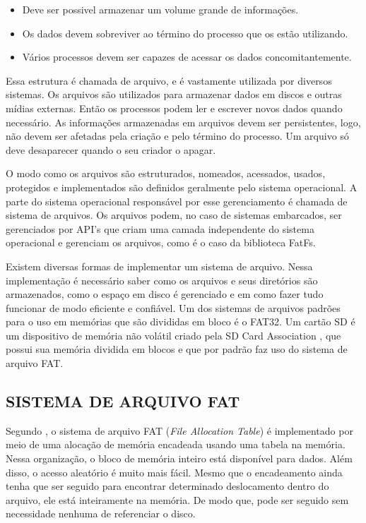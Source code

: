\begin{itemize}
    \item Deve ser possivel armazenar um volume grande de informações.
    \item Os dados devem sobreviver ao término do processo que os estão utilizando.
    \item Vários processos devem ser capazes de acessar os dados concomitantemente.
\end{itemize}

Essa estrutura é chamada de arquivo, e é vastamente utilizada por diversos sistemas. Os arquivos são utilizados para armazenar dados em discos e outras mídias externas. Então os processos podem ler e escrever novos dados quando necessário. As informações armazenadas em arquivos devem ser persistentes, logo, não devem ser afetadas pela criação e pelo término do processo. Um arquivo só deve desaparecer quando o seu criador o apagar.

O modo como os arquivos são estruturados, nomeados, acessados, usados, protegidos e implementados são definidos geralmente pelo sistema operacional. A parte do sistema operacional responsável por esse gerenciamento é chamada de sistema de arquivos. Os arquivos podem, no caso de sistemas embarcados, ser gerenciados por API's que criam uma camada independente do sistema operacional e gerenciam os arquivos, como é o caso da biblioteca FatFs. 

Existem diversas formas de implementar um sistema de arquivo. Nessa implementação é necessário saber como os arquivos e seus diretórios são armazenados, como o espaço em disco é gerenciado e em como fazer tudo funcionar de modo eficiente e confiável. 
Um dos sistemas de arquivos padrões para o uso em memórias que são divididas em bloco é o FAT32. 
Um cartão SD é um dispositivo de memória não volátil criado pela SD Card Association \cite{SDCARD}, que possui sua memória dividida em blocos e que por padrão faz uso do sistema de arquivo FAT.




\subsection{SISTEMA DE ARQUIVO FAT}

Segundo , o sistema de arquivo FAT (\textit{File Allocation Table}) é implementado por meio de uma alocação de memória encadeada usando uma tabela na memória. Nessa organização, o bloco de memória inteiro está disponível para dados. Além disso, o acesso aleatório é muito mais fácil. Mesmo que o encadeamento ainda tenha que ser seguido para encontrar determinado deslocamento dentro do arquivo, ele está inteiramente na memória. De modo que, pode ser seguido sem necessidade nenhuma de referenciar o disco.

